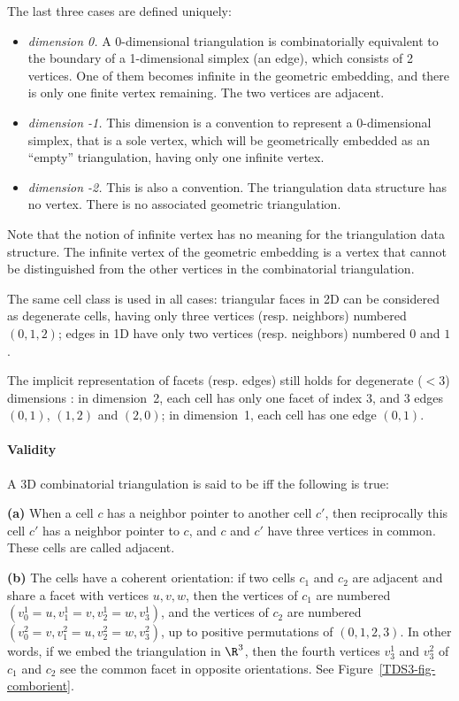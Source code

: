 The last three cases are defined uniquely:
\begin{itemize}
\item \emph{dimension 0.} A 0-dimensional triangulation is
combinatorially equivalent to the boundary of a 1-dimensional simplex
(an edge), which consists of 2 vertices. One of them becomes infinite
in the geometric embedding, and there is only one finite vertex
remaining. The two vertices are adjacent.
\item \emph{dimension -1.} This dimension is a convention to represent a 
0-dimensional simplex, that is a sole vertex, which will be
geometrically embedded as an ``empty'' triangulation, having only one
infinite vertex.
\item \emph{dimension -2.} This is also a convention. The
triangulation data structure has no vertex. There is no associated
geometric triangulation.
\end{itemize} 

Note that the notion of infinite vertex has no meaning for the
triangulation data structure. The infinite vertex of the geometric
embedding is a vertex that cannot be distinguished from the other
vertices in the combinatorial triangulation.

The same cell class is used in all cases: triangular faces in
2D can be considered as degenerate cells, having only three vertices
(resp. neighbors) numbered $(0,1,2)$;
edges in 1D have only two vertices (resp. neighbors) numbered $0$ and $1$.

The implicit representation of facets (resp. edges) still holds
for degenerate ($< 3$) dimensions : in dimension~2, each cell has only one
facet of index 3, and 3 edges $(0,1)$, $(1,2)$ and $(2,0)$; in
dimension~1, each cell has one edge $(0,1)$. 

\paragraph{Validity}
A 3D combinatorial triangulation is said to be  
iff the following is true:

{\bf (a)} When a cell $c$ has a neighbor pointer to another cell $c'$,
then reciprocally this cell $c'$ has a neighbor pointer to $c$, and
$c$ and $c'$ have three vertices in common. These cells are called
adjacent. 

{\bf (b)} The cells have a coherent orientation: if two cells $c_1$
and $c_2$ are adjacent and share a facet with vertices $u,v,w$, then
the vertices of $c_1$ are numbered $(v_0^1 = u, v_1^1 = v, v_2^1 = w,
v_3^1)$, and the vertices of $c_2$ are numbered $(v_0^2 = v, v_1^2 = u,
v_2^2 = w, v_3^2)$, up to positive permutations of $(0,1,2,3)$. In
other words, if we embed the triangulation in $\R^3$, then the fourth
vertices $v_3^1$ and $v_3^2$ of $c_1$ and $c_2$ see the common facet
in opposite orientations. See Figure~\ref{TDS3-fig-comborient}.

